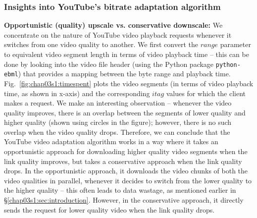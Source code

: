 \subsubsection{Insights into YouTube's bitrate adaptation algorithm}
\label{chap03s1:subsec:seglength}
{\bf Opportunistic (quality) upscale vs. conservative downscale:} We concentrate on the nature of YouTube video playback requests whenever it switches from one video quality to another.
We first convert the $range$ parameter to equivalent video segment length in terms of video playback time -- this can be done by looking into the video file header (using the Python package \texttt{python-ebml}) that provides a mapping between the byte range and playback time.
Fig.~\ref{fig:chap03s1:timespent} plots the video segments (in terms of video playback time, as shown in x-axis) and the corresponding $itag$ values for which the client makes a request.
We make an interesting observation -- whenever the video quality improves, there is an overlap between the segments of lower quality and higher quality (shown using circles in the figure); however, there is no such overlap when the video quality drops.
Therefore, we can conclude that the YouTube video adaptation algorithm works in a way where it takes an opportunistic approach for downloading higher quality video segments when the link quality improves, but takes a conservative approach when the link quality drops.
In the opportunistic approach, it downloads the video chunks of both the video qualities in parallel, whenever it decides to switch from the lower quality to the higher quality -- this often leads to data wastage, as mentioned earlier in \S\ref{chap03s1:sec:introduction}.
However, in the conservative approach, it directly sends the request for lower quality video when the link quality drops.

